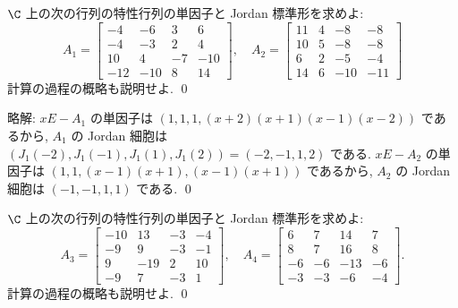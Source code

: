 \documentclass[12pt,twoside]{jarticle}
\newcommand\commentout[1]{#1}
\newcommand\commentout[1]{}
\begin{document}
\begin{question}
\label{q:ed-j-1}
  $\C$ 上の次の行列の特性行列の単因子と Jordan 標準形を求めよ:
  \begin{equation*}
    A_1 = \left[ 
      \begin{array}{rrrr}
        -4 & -6 & 3 & 6 \\
        -4 & -3 & 2 & 4 \\
        10 & 4 & -7 & -10 \\
        -12 & -10 & 8 & 14
      \end{array}
    \right],
    \quad
    A_2 = \left[ 
      \begin{array}{rrrr}
        11 & 4 & -8 & -8 \\
        10 & 5 & -8 & -8 \\
        6 & 2 & -5 & -4 \\
        14 & 6 & -10 & -11
      \end{array}
    \right]
  \end{equation*}
  計算の過程の概略も説明せよ. \qed
\end{question}

\commentout{
\noindent
略解: $xE-A_1$ の単因子は $(1,1,1,(x+2)(x+1)(x-1)(x-2))$ であるから,
$A_1$ の Jordan 細胞は $(J_1(-2),J_1(-1),J_1(1),J_1(2))=(-2,-1,1,2)$ である.
$xE-A_2$ の単因子は $(1,1,(x-1)(x+1),(x-1)(x+1))$ であるから,
$A_2$ の Jordan 細胞は $(-1,-1,1,1)$ である.
\qed
}


\begin{question}
\label{q:ed-j-2}
  $\C$ 上の次の行列の特性行列の単因子と Jordan 標準形を求めよ:
  \begin{equation*}
    A_3 = \left[ 
      \begin{array}{rrrr}
        -10 & 13 & -3 & -4 \\
        -9 & 9 & -3 & -1 \\
        9 & -19 & 2 & 10 \\
        -9 & 7 & -3 & 1
      \end{array}
    \right],
    \quad
    A_4 = \left[ 
      \begin{array}{rrrr}
        6 & 7 & 14 & 7 \\
        8 & 7 & 16 & 8 \\
        -6 & -6 & -13 & -6 \\
        -3 & -3 & -6 & -4
      \end{array}
    \right].
  \end{equation*}
  計算の過程の概略も説明せよ. \qed
\end{question}
\end{document}
